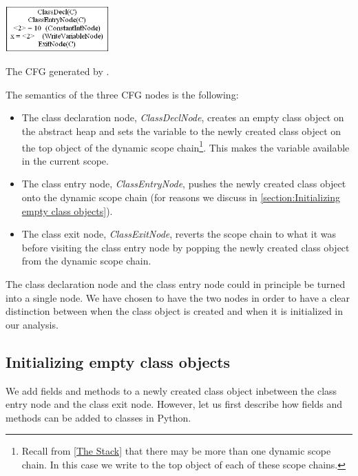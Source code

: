 \begin{listing}[H]
	\begin{center}
		\includegraphics[width=0.3\textwidth]{images/class-decl-cfg.png}
	\end{center}
	\vspace{-10pt}
	\caption{The CFG generated by .}
\end{listing}

The semantics of the three CFG nodes is the following:

\begin{itemize}
	\item The class declaration node, \textit{ClassDeclNode}, creates an empty class object on the abstract heap and sets the variable  to the newly created class object on the top object of the dynamic scope chain\footnote{Recall from \autoref{The Stack} that there may be more than one dynamic scope chain. In this case we write  to the top object of each of these scope chains.}. This makes the variable  available in the current scope.
	\item The class entry node, \textit{ClassEntryNode}, pushes the newly created class object onto the dynamic scope chain (for reasons we discuss in \autoref{section:Initializing empty class objects}).
	\item The class exit node, \textit{ClassExitNode}, reverts the scope chain to what it was before visiting the class entry node by popping the newly created class object from the dynamic scope chain.
\end{itemize}

The class declaration node and the class entry node could in principle be turned into a single node. We have chosen to have the two nodes in order to have a clear distinction between when the class object is created and when it is initialized in our analysis.


\subsection{Initializing empty class objects}
\label{section:Initializing empty class objects}
We add fields and methods to a newly created class object inbetween the class entry node and the class exit node. However, let us first describe how fields and methods can be added to classes in Python.

